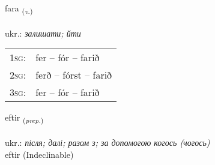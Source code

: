 \documentclass[frontgrid, backgrid]{flacards}\usepackage[]{graphicx}\usepackage[]{xcolor}
\begin{document}
\renewcommand{\flhead}{\vskip5pt \fboxsep=0pt {\small\bfseries\footnotesize Sagnorð | дієслово}}
\renewcommand{\fcfoot}{\vskip5pt \fboxsep=0pt \hspace{2pt}{\small\bfseries\footnotesize 1K}}

\renewcommand{\blhead}{\vskip5pt {\small\bfseries\footnotesize Sagnorð | дієслово }}
\renewcommand{\bcfoot}{\vskip5pt \hspace{2pt}{\small\bfseries\footnotesize 1K}}


{fara \small{\textsubscript{(\textit{v.})}} \\[1ex] %
\textphonetic{[faːra]} \\
ukr.: \emph{залишати; йти} \\  [2ex]
\renewcommand*{\arraystretch}{0.8}
\begin{tabular}{p{1cm}l}
\textsc{1sg}: & fer -- fór -- farið \\ 
\textsc{2sg}: & ferð -- fórst -- farið \\ 
\textsc{3sg}: & fer -- fór -- farið \\ 
\end{tabular}
}


\renewcommand{\flhead}{\vskip5pt \fboxsep=0pt {\small\bfseries\footnotesize Forsetning | прийменник}}
\renewcommand{\fcfoot}{\vskip5pt \fboxsep=0pt \hspace{2pt}{\small\bfseries\footnotesize 1K}}

\renewcommand{\blhead}{\vskip5pt {\small\bfseries\footnotesize Forsetning | прийменник }}
\renewcommand{\bcfoot}{\vskip5pt \hspace{2pt}{\small\bfseries\footnotesize 1K}}


{eftir \small{\textsubscript{(\textit{prep.})}} \\[1ex]
\textphonetic{[ɛftɪr]} \\
ukr.: \emph{після; далі; разом з; за допомогою когось (чогось)} \\  [2ex]
eftir (Indeclinable)}
\end{document}
